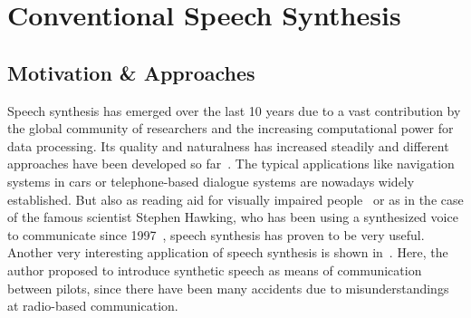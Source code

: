

\section{Conventional Speech Synthesis}
\label{sec:speech}

\subsection{Motivation \& Approaches}
\label{subsec:convenspeech}

Speech synthesis has emerged over the last 10 years due to a vast contribution by the global community of researchers and the increasing computational power for data processing. Its quality and naturalness has increased steadily and different approaches have been developed so far~\cite{suendermann:challenges}. The typical applications like navigation systems in cars or telephone-based dialogue systems are nowadays widely established. But also as reading aid for visually impaired people~\cite{readspeaker:tts} or as in the case of the famous scientist Stephen Hawking, who has been using a synthesized voice to communicate since 1997~\cite{hawking:speech}, speech synthesis has proven to be very useful. Another very interesting application of speech synthesis is shown in~\cite{dhavala:communication}. Here, the author proposed to introduce synthetic speech as means of communication between pilots, since there have been many accidents due to misunderstandings at radio-based communication. %

